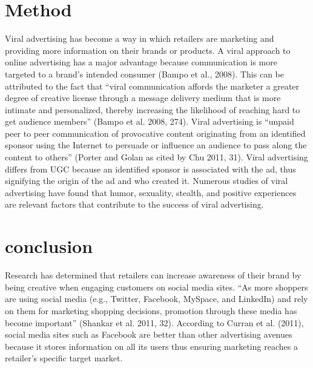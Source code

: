 \documentclass[10pt]{article}
\begin{document}
\section{Method}
Viral advertising has become a way in which retailers are marketing and providing more
information on their brands or products. A viral approach to online advertising has a major
advantage because communication is more targeted to a brand’s intended consumer (Bampo et
al., 2008). This can be attributed to the fact that “viral communication affords the marketer a
greater degree of creative license through a message delivery medium that is more intimate and
personalized, thereby increasing the likelihood of reaching hard to get audience members”
(Bampo et al. 2008, 274). Viral advertising is “unpaid peer to peer communication of
provocative content originating from an identified sponsor using the Internet to persuade or
influence an audience to pass along the content to others” (Porter and Golan as cited by Chu
2011, 31). Viral advertising differs from UGC because an identified sponsor is associated with
the ad, thus signifying the origin of the ad and who created it. Numerous studies of viral
advertising have found that humor, sexuality, stealth, and positive experiences are relevant
factors that contribute to the success of viral advertising.
\section{conclusion}
Research has determined that retailers can increase awareness of their
brand by being creative when engaging customers on social media sites. “As more shoppers are
using social media (e.g., Twitter, Facebook, MySpace, and LinkedIn) and rely on them for
marketing shopping decisions, promotion through these media has become important” (Shankar
et al. 2011, 32). According to Curran et al. (2011), social media sites such as Facebook are better
than other advertising avenues because it stores information on all its users thus ensuring
marketing reaches a retailer’s specific target market.

  
\end{document}
